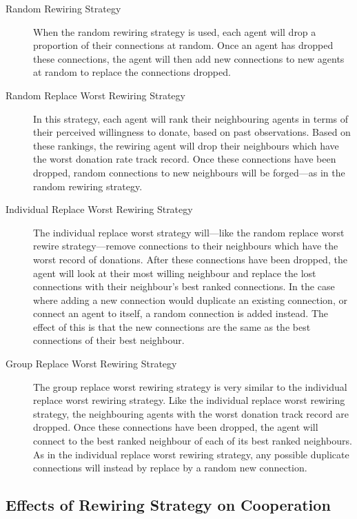 \begin{description}
\item[Random Rewiring Strategy]
When the random rewiring strategy is used,
each agent will drop a proportion of their connections at random.
Once an agent has dropped these connections, the agent will then add new
connections to new agents at random to replace the connections dropped.

\item[Random Replace Worst Rewiring Strategy]
In this strategy, each agent will rank their neighbouring agents in terms
of their perceived willingness to donate, based on past observations.
Based on these rankings, the rewiring agent will drop their neighbours
which have the worst donation rate track record. Once these connections have
been dropped, random connections to new neighbours will be forged---as in
the random rewiring strategy.

\item[Individual Replace Worst Rewiring Strategy]
The individual replace worst strategy will---like the random replace
worst rewire strategy---remove connections to their neighbours which have
the worst record of donations. After these connections have been dropped,
the agent will look at their most willing neighbour and replace the lost
connections with their neighbour's best ranked connections. In the case where
adding a new connection would duplicate an existing connection, or connect an
agent to itself, a random connection is added instead. The effect of this is
that the new connections are the same as the best connections of their best
neighbour.

\item[Group Replace Worst Rewiring Strategy]
The group replace worst rewiring strategy is very similar to the individual
replace worst rewiring strategy. Like the individual replace worst rewiring
strategy, the neighbouring agents with the worst donation track record are
dropped. Once these connections have been dropped, the agent will connect
to the best ranked neighbour of each of its best ranked neighbours. As in the
individual replace worst rewiring strategy, any possible duplicate connections
will instead by replace by a random new connection.

\end{description}

\subsection{Effects of Rewiring Strategy on Cooperation}

